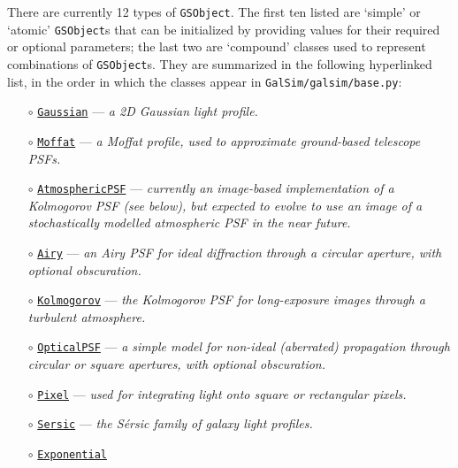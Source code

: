\documentclass[preprint,11pt]{aastex}
\newcommand{\gsobject}{{\tt GSObject}}
\begin{document}
There are currently 12 types of \gsobject. The first ten listed are
`simple' or `atomic' \gsobject s that can be initialized by providing
values for their required or optional parameters; the last two are
`compound' classes used to represent combinations of \gsobject s.  
They are summarized in the following hyperlinked list, 
in the order in which the classes appear in {\tt GalSim/galsim/base.py}:
\begin{itemize}
\item[$\circ$]
  \href{http://galsim-developers.github.com/GalSim/classgalsim_1_1base_1_1_gaussian.html}{\texttt{Gaussian}}
  --- \emph{a 2D Gaussian light profile.}
\item[$\circ$]
  \href{http://galsim-developers.github.com/GalSim/classgalsim_1_1base_1_1_moffat.html}{\texttt{Moffat}}
  --- \emph{a Moffat profile, used to approximate ground-based
    telescope PSFs.}
\item[$\circ$] \href{http://galsim-developers.github.com/GalSim/classgalsim_1_1base_1_1_atmospheric_p_s_f.html}{\texttt{AtmosphericPSF}} --- \emph{currently an image-based
  implementation of a Kolmogorov PSF (see below), but expected to evolve to
  use an image of a stochastically modelled atmospheric PSF in the near future.}
\item[$\circ$] \href{http://galsim-developers.github.com/GalSim/classgalsim_1_1base_1_1_airy.html}{\texttt{Airy}} --- \emph{an Airy PSF for ideal diffraction
  through a circular aperture, with optional obscuration.}
\item[$\circ$] \href{http://galsim-developers.github.com/GalSim/classgalsim_1_1base_1_1_kolmogorov.html}{\texttt{Kolmogorov}} --- \emph{the Kolmogorov PSF for long-exposure
  images through a turbulent atmosphere.}
\item[$\circ$] \href{http://galsim-developers.github.com/GalSim/classgalsim_1_1base_1_1_optical_p_s_f.html}{\texttt{OpticalPSF}} --- \emph{a simple model for non-ideal
  (aberrated) propagation through circular or square apertures, with
  optional obscuration.}
\item[$\circ$] \href{http://galsim-developers.github.com/GalSim/classgalsim_1_1base_1_1_pixel.html}{\texttt{Pixel}} --- \emph{used for integrating light onto square or
  rectangular pixels.}
\item[$\circ$] \href{http://galsim-developers.github.com/GalSim/classgalsim_1_1base_1_1_sersic.html}{\texttt{Sersic}} ---\emph{ the S\'{e}rsic family of galaxy light
  profiles.}
\item[$\circ$]
  \href{http://galsim-developers.github.com/GalSim/classgalsim_1_1base_1_1_exponential.html}{\texttt{Exponential}}

\end{itemize}
\end{document}
